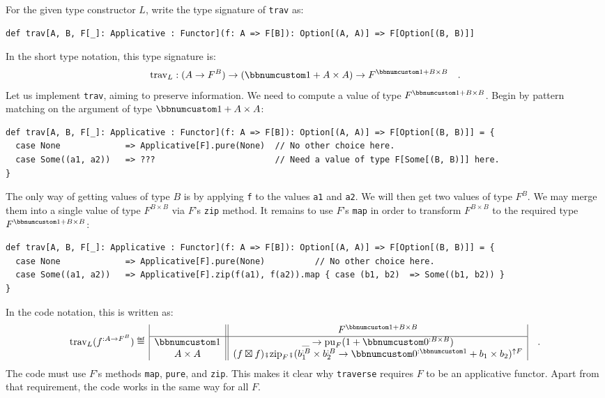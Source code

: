 For the given type constructor $L$, write the type signature of \lstinline!trav!
as:
\begin{lstlisting}
def trav[A, B, F[_]: Applicative : Functor](f: A => F[B]): Option[(A, A)] => F[Option[(B, B)]]
\end{lstlisting}
In the short type notation, this type signature is:
\[
\text{trav}_{L}:(A\rightarrow F^{B})\rightarrow(\bbnum 1+A\times A)\rightarrow F^{\bbnum 1+B\times B}\quad.
\]
 Let us implement \lstinline!trav!, aiming to preserve information.
We need to compute a value of type $F^{\bbnum 1+B\times B}$. Begin
by pattern matching on the argument of type $\bbnum 1+A\times A$:
\begin{lstlisting}
def trav[A, B, F[_]: Applicative : Functor](f: A => F[B]): Option[(A, A)] => F[Option[(B, B)]] = {
  case None             => Applicative[F].pure(None)  // No other choice here.
  case Some((a1, a2))   => ???                        // Need a value of type F[Some[(B, B)]] here.
}
\end{lstlisting}
The only way of getting values of type $B$ is by applying \lstinline!f!
to the values \lstinline!a1! and \lstinline!a2!. We will then get
two values of type $F^{B}$. We may merge them into a single value
of type $F^{B\times B}$ via $F$\textsf{'}s \lstinline!zip! method. It remains
to use $F$\textsf{'}s \lstinline!map! in order to transform $F^{B\times B}$
to the required type $F^{\bbnum 1+B\times B}$:
\begin{lstlisting}
def trav[A, B, F[_]: Applicative : Functor](f: A => F[B]): Option[(A, A)] => F[Option[(B, B)]] = {
  case None             => Applicative[F].pure(None)          // No other choice here.
  case Some((a1, a2))   => Applicative[F].zip(f(a1), f(a2)).map { case (b1, b2)  => Some((b1, b2)) }
}
\end{lstlisting}
In the code notation, this is written as:
\[
\text{trav}_{L}(f^{:A\rightarrow F^{B}})\triangleq\,\begin{array}{|c||c|}
 & F^{\bbnum 1+B\times B}\\
\hline \bbnum 1 & \_\rightarrow\text{pu}_{F}(1+\bbnum 0^{:B\times B})\\
A\times A & (f\boxtimes f)\bef\text{zip}_{F}\bef(b_{1}^{:B}\times b_{2}^{:B}\rightarrow\bbnum 0^{:\bbnum 1}+b_{1}\times b_{2})^{\uparrow F}
\end{array}\quad.
\]
The code must use $F$\textsf{'}s methods \lstinline!map!, \lstinline!pure!,
and \lstinline!zip!. This makes it clear why \lstinline!traverse!
requires $F$ to be an applicative functor. Apart from that requirement,
the code works in the same way for all $F$.


